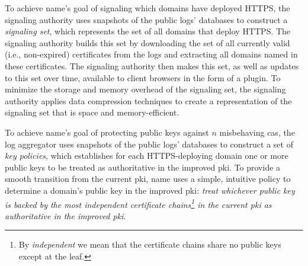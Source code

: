 To achieve \ac{name}'s goal of signaling which domains have deployed HTTPS, the
signaling authority uses snapshots of the public logs' databases to construct a
\emph{signaling set}, which represents the set of all domains that deploy HTTPS.
The signaling authority builds this set by downloading the set of all currently
valid (i.e., non-expired) certificates from the logs and extracting all domains
named in these certificates. The signaling authority then makes this set, as
well as updates to this set over time, available to client browsers in the form
of a plugin. To minimize the storage and memory overhead of the signaling set,
the signaling authority applies data compression techniques to create a
representation of the signaling set that is space and memory-efficient.

To achieve \ac{name}'s goal of protecting public keys against $n$ misbehaving
\acp{ca}, the log aggregator uses snapshots of the public logs' databases to
construct a set of \emph{key policies}, which establishes for each
HTTPS-deploying domain one or more public keys to be treated as authoritative in
the improved \ac{pki}. To provide a smooth transition from the current \ac{pki},
\ac{name} uses a simple, intuitive policy to determine a domain's public key in
the improved \ac{pki}: \emph{treat whichever public key is backed by the most
  independent certificate chains\footnote{By \emph{independent} we mean that the
  certificate chains share no public keys except at the leaf.} in the current
\ac{pki} as authoritative in the improved \ac{pki}}.




